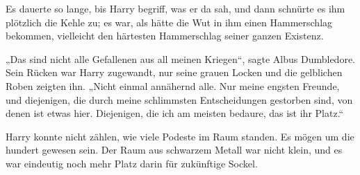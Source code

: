Es dauerte so lange, bis Harry begriff, was er da sah, und dann schnürte es ihm plötzlich die Kehle zu; es war, als hätte die Wut in ihm einen Hammerschlag bekommen, vielleicht den härtesten Hammerschlag seiner ganzen Existenz.

„Das sind nicht alle Gefallenen aus all meinen Kriegen“, sagte Albus Dumbledore. Sein Rücken war Harry zugewandt, nur seine grauen Locken und die gelblichen Roben zeigten ihn. „Nicht einmal annähernd alle. Nur meine engsten Freunde, und diejenigen, die durch meine schlimmsten Entscheidungen gestorben sind, von denen ist etwas hier. Diejenigen, die ich am meisten bedaure, das ist ihr Platz.“

Harry konnte nicht zählen, wie viele Podeste im Raum standen. Es mögen um die hundert gewesen sein. Der Raum aus schwarzem Metall war nicht klein, und es war eindeutig noch mehr Platz darin für zukünftige Sockel.

